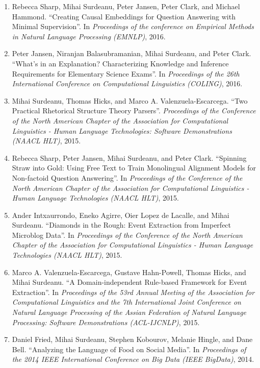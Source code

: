 \documentclass[10pt]{article}
\newcommand{\ve}[1]{{\em #1}} %
\newcommand{\ti}[1]{``#1''} %
\begin{document}
\begin{description}
\begin{enumerate}
\item
Rebecca Sharp, Mihai Surdeanu, Peter Jansen, Peter Clark, and Michael Hammond.  \ti{Creating Causal Embeddings for Question Answering with Minimal Supervision}.  In \ve{Proceedings of the conference on Empirical Methods in Natural Language Processing (EMNLP)}, 2016.

\item
Peter Jansen, Niranjan Balasubramanian, Mihai Surdeanu, and Peter Clark.  \ti{What's in an Explanation? Characterizing Knowledge and Inference Requirements for Elementary Science Exams}.  In \ve{Proceedings of the 26th International Conference on Computational Linguistics (COLING)}, 2016.

\item
Mihai Surdeanu, Thomas Hicks, and Marco A. Valenzuela-Escarcega.  \ti{Two Practical Rhetorical Structure Theory Parsers}. \ve{Proceedings of the Conference of the North American Chapter of the Association for Computational Linguistics - Human Language Technologies: Software Demonstrations (NAACL HLT)}, 2015. 

\item
Rebecca Sharp, Peter Jansen, Mihai Surdeanu, and Peter Clark.  \ti{Spinning Straw into Gold: Using Free Text to Train Monolingual Alignment Models for Non-factoid Question Answering}.  In \ve{Proceedings of the Conference of the North American Chapter of the Association for Computational Linguistics - Human Language Technologies (NAACL HLT)}, 2015. 

\item
Ander Intxaurrondo, Eneko Agirre, Oier Lopez de Lacalle, and Mihai Surdeanu.  \ti{Diamonds in the Rough: Event Extraction from Imperfect Microblog Data}.  In \ve{Proceedings of the Conference of the North American Chapter of the Association for Computational Linguistics - Human Language Technologies (NAACL HLT)}, 2015.

\item
Marco A. Valenzuela-Escarcega, Gustave Hahn-Powell, Thomas Hicks, and Mihai Surdeanu.  \ti{A Domain-independent Rule-based Framework for Event Extraction}.  In \ve{Proceedings of the 53rd Annual Meeting of the Association for Computational Linguistics and the 7th International Joint Conference on Natural Language Processing of the Assian Federation of Natural Language Processing: Software Demonstrations (ACL-IJCNLP)}, 2015.

\item
Daniel Fried, Mihai Surdeanu, Stephen Kobourov, Melanie Hingle, and Dane Bell.  \ti{Analyzing the Language of Food on Social Media}.  In \ve{Proceedings of the 2014 IEEE International Conference on Big Data (IEEE BigData)}, 2014.


\end{enumerate}
\end{description}
\end{document}
